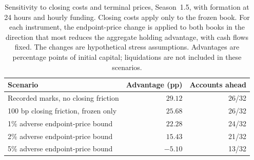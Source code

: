 \begin{table}[ht]
\centering\small
\caption{Sensitivity to closing costs and terminal prices, Season~1.5,
with formation at 24 hours and hourly funding. Closing costs apply only
to the frozen book. For each instrument, the endpoint-price change is
applied to both books in the direction that most reduces the aggregate
holding advantage, with cash flows fixed. The changes are hypothetical
stress assumptions. Advantages are percentage points of initial capital;
liquidations are not included in these scenarios.}
\label{tab:reviewstress}
\begin{tabular}{lrr}
\toprule
Scenario & Advantage (pp) & Accounts ahead \\
\midrule
Recorded marks, no closing friction & $29.12$ & 26/32 \\
100 bp closing friction, frozen only & $25.68$ & 26/32 \\
1\% adverse endpoint-price bound & $22.28$ & 24/32 \\
2\% adverse endpoint-price bound & $15.43$ & 21/32 \\
5\% adverse endpoint-price bound & $-5.10$ & 13/32 \\
\bottomrule
\end{tabular}
\end{table}

